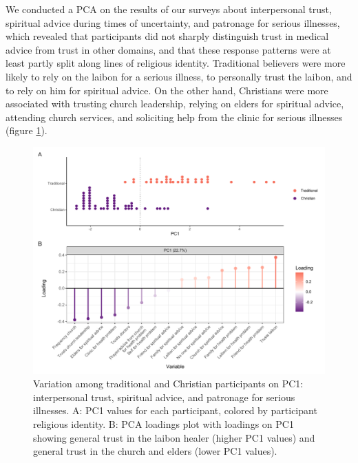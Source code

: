 \documentclass[
  11pt,
]{article}
\begin{document}
We conducted a PCA on the results of our surveys about interpersonal trust, spiritual advice during times of uncertainty, and patronage for serious illnesses, which revealed that participants did not sharply distinguish trust in medical advice from trust in other domains, and that these response patterns were at least partly split along lines of religious identity. Traditional believers were more likely to rely on the laibon for a serious illness, to personally trust the laibon, and to rely on him for spiritual advice. On the other hand, Christians were more associated with trusting church leadership, relying on elders for spiritual advice, attending church services, and soliciting help from the clinic for serious illnesses (figure \ref{fig:fieldplotlaibonPCA}).

\begin{landscape}

\begin{figure}[p]

{\centering \includegraphics{magic-healers-article2_files/figure-latex/fieldplotlaibonPCA-1} 

}

\caption{Variation among traditional and Christian participants on PC1: interpersonal trust, spiritual advice, and patronage for serious illnesses. A: PC1 values for each participant, colored by participant religious identity. B: PCA loadings plot with loadings on PC1 showing general trust in the laibon healer (higher PC1 values) and general trust in the church and elders (lower PC1 values).}\label{fig:fieldplotlaibonPCA}
\end{figure}

\end{landscape}
\end{document}
